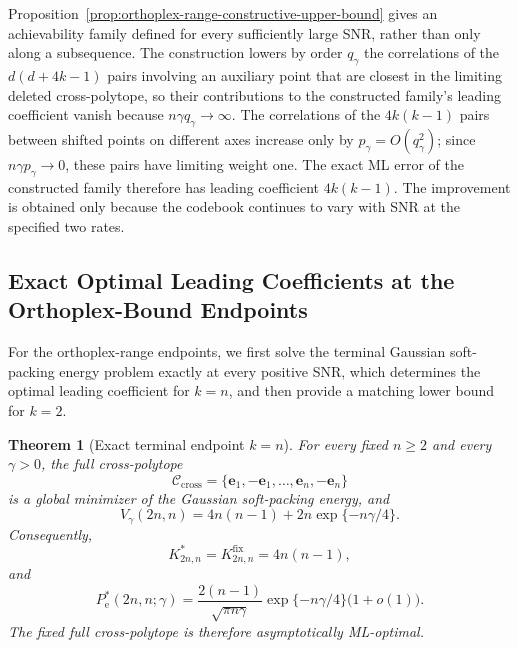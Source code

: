 \documentclass[12pt,draftclsnofoot,onecolumn]{IEEEtran}
\newcommand{\cC}{\mathcal{C}}
\newcommand{\Pe}{P_{\mathrm e}}
\newcommand{\be}{\bm e}
\newtheorem{theorem}{Theorem}
\theoremstyle{definition}
\begin{document}
Proposition~\ref{prop:orthoplex-range-constructive-upper-bound} gives an
achievability family defined for every sufficiently large SNR, rather
than only along a subsequence.  The construction lowers by order
\(q_\gamma\) the correlations of the \(d(d+4k-1)\) pairs involving an auxiliary point that
are closest in the limiting deleted cross-polytope, so their contributions
to the constructed family's leading coefficient vanish because
\(n\gamma q_\gamma\to\infty\).  The correlations of the \(4k(k-1)\) pairs
between shifted points on different axes increase only by
\(p_\gamma=O(q_\gamma^2)\); since \(n\gamma p_\gamma\to0\), these
pairs have limiting weight one.  The exact ML error of the constructed
family therefore has leading coefficient \(4k(k-1)\).  The improvement is obtained only
because the codebook continues to vary with SNR at the specified two
rates.  

 


 


\subsection{Exact Optimal Leading Coefficients at the Orthoplex-Bound Endpoints}
\label{subsec:orthoplex-exact-endpoints}

For the orthoplex-range endpoints, we first solve the terminal Gaussian
soft-packing energy problem exactly at every positive SNR, which
determines the optimal leading coefficient for \(k=n\), and then provide
a matching lower bound for \(k=2\).

\begin{theorem}[Exact terminal endpoint \(k=n\)]
\label{thm:orthoplex-terminal-endpoint-coefficient}
For every fixed \(n\ge2\) and every \(\gamma>0\), the full
cross-polytope
\[
  \cC_{\mathrm{cross}}
  =\{\be_1,-\be_1,\ldots,\be_n,-\be_n\}
\]
is a global minimizer of the Gaussian soft-packing energy, and
\begin{equation}
  V_\gamma(2n,n)
  =4n(n-1)+2n\exp\{-n\gamma/4\}.
  \label{eq:orthoplex-terminal-endpoint-soft-energy}
\end{equation}
Consequently,
\begin{equation}
  K^{\ast}_{2n,n}
  =K^{\mathrm{fix}}_{2n,n}
  =4n(n-1),
  \label{eq:orthoplex-terminal-endpoint-coefficient}
\end{equation}
and
\begin{equation}
  \Pe^{\ast}(2n,n;\gamma)
  =
  \frac{2(n-1)}{\sqrt{\pi n\gamma}}
  \exp\{-n\gamma/4\}
  \bigl(1+o(1)\bigr).
  \label{eq:orthoplex-terminal-endpoint-awgn-asymptotic}
\end{equation}
The fixed full cross-polytope is therefore asymptotically ML-optimal.
\end{theorem}
\end{document}
